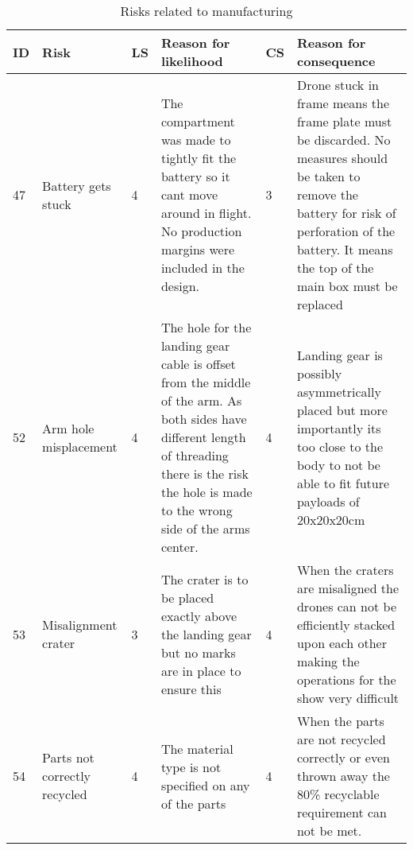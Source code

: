 \begin{table}[H]
\centering
\caption{Risks related to manufacturing}

\label{tab:pprisks}
\begin{scriptsize}
\begin{tabular}{|p{0.4cm}|p{3cm}|p{0.4cm}|p{4.5cm}|p{0.4cm}|p{4.5cm}|}
\hline
\multicolumn{1}{|l|}{\textbf{ID}} & \textbf{Risk}                                               & \multicolumn{1}{l|}{\textbf{LS}} & \textbf{Reason for likelihood}                                                                  & \multicolumn{1}{l|}{\textbf{CS}} & \textbf{Reason for consequence}                                                            \\ \hline

47 & Battery gets stuck & 4 & The compartment was made to tightly fit the battery so it cant move around in flight. No production margins were included in the design. & 3 & Drone stuck in frame means the frame plate must be discarded. No measures should be taken to remove the battery for risk of perforation of the battery. It means the top of the main box must be replaced \\ \hline 
52 & Arm hole misplacement & 4 & The hole for the landing gear cable is offset from the middle of the arm. As both sides have different length of threading there is the risk the hole is made to the wrong side of the arms center. & 4 & Landing gear is possibly asymmetrically placed but more importantly its too close to the body to not be able to fit future payloads of 20x20x20cm\\ \hline 
53 & Misalignment crater & 3 & The crater is to be placed exactly above the landing gear but no marks are in place to ensure this& 4 &When the craters are misaligned the drones can not be efficiently stacked upon each other making the operations for the show very difficult \\ \hline
54 & Parts not correctly recycled & 4 & The material type is not specified on any of the parts & 4 & When the parts are not recycled correctly or even thrown away the 80\% recyclable requirement can not be met.  \\ \hline

\end{tabular}
\end{scriptsize}
\end{table}

